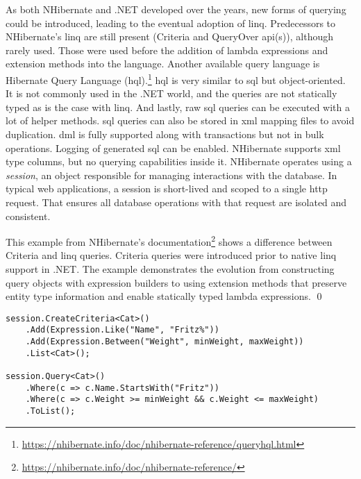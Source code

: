 As both NHibernate and .NET developed over the years, new forms of querying could be introduced, leading to the eventual adoption of \acrshort{linq}. Predecessors to NHibernate's \acrshort{linq} are still present (Criteria and QueryOver \acrshort{api}(s)), although rarely used. Those were used before the addition of lambda expressions and extension methods into the language. Another available query language is Hibernate Query Language (\acrshort{hql}).\footnote{\url{https://nhibernate.info/doc/nhibernate-reference/queryhql.html}} \acrshort{hql} is very similar to \acrshort{sql} but object-oriented. It is not commonly used in the .NET world, and the queries are not statically typed as is the case with \acrshort{linq}. And lastly, raw \acrshort{sql} queries can be executed with a lot of helper methods. \acrshort{sql} queries can also be stored in \acrshort{xml} mapping files to avoid duplication. \acrshort{dml} is fully supported along with transactions but not in bulk operations. Logging of generated \acrshort{sql} can be enabled. NHibernate supports \acrshort{xml} type columns, but no querying capabilities inside it. NHibernate operates using a \textit{session}, an object responsible for managing interactions with the database. In typical web applications, a session is short-lived and scoped to a single \acrshort{http} request. That ensures all database operations with that request are isolated and consistent.

\begin{example}
\small
This example from NHibernate's documentation\footnote{\url{https://nhibernate.info/doc/nhibernate-reference/}} shows a difference between Criteria and \acrshort{linq} queries. Criteria queries were introduced prior to native \acrshort{linq} support in .NET. The example demonstrates the evolution from constructing query objects with expression builders to using extension methods that preserve entity type information and enable statically typed lambda expressions.
\qed

\begin{lstlisting}[language=CSharp]
session.CreateCriteria<Cat>()
    .Add(Expression.Like("Name", "Fritz%"))
    .Add(Expression.Between("Weight", minWeight, maxWeight))
    .List<Cat>();

session.Query<Cat>()
    .Where(c => c.Name.StartsWith("Fritz"))
    .Where(c => c.Weight >= minWeight && c.Weight <= maxWeight)
    .ToList();
\end{lstlisting}
\end{example}

